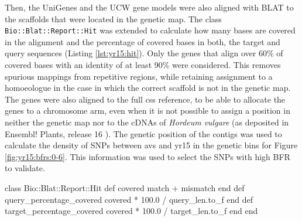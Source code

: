 Then, the UniGenes and the UCW gene models were also aligned with BLAT to the scaffolds that were located in the genetic map.  
The class \texttt{Bio::Blat::Report::Hit}  was extended to calculate how many bases are covered in the alignment and the percentage of covered bases in both, the target and query sequences (Listing \ref{lst:yr15:hit}).
Only the genes that align over 60\% of covered bases with an identity of at least 90\% were considered. 
This removes spurious mappings from repetitive regions, while retaining assignment to a homoeologue in the case in which the correct scaffold is not in the genetic map. 
The genes were also aligned to the full \acrshort{css} reference, to be able to allocate the genes to a chromosome arm, even when it is not possible to assign a position in neither the genetic map nor to the cDNAs of \textit{Hordeum vulgare} \citep{Mayer2011} (as deposited in Ensembl! Plants, release 16 \citep{Kersey2012}). 
The genetic position of the contigs was used to calculate the density of SNPs between \acrshort{avs} and \acrshort{yr15} in the genetic bins for Figure \ref{fig:yr15:bfrs:0-6}. 
This information was used to select the SNPs with high BFR to validate.  

\begin{code}[language=Ruby, caption=Extension to \texttt{Bio::Blat::Report::Hit} for filtering of spurious alignments., label=lst:yr15:hit]
class Bio::Blat::Report::Hit
  def covered
    match + mismatch
  end
  def query_percentage_covered
    covered * 100.0 / query_len.to_f
  end
  def target_percentage_covered
    covered * 100.0 / target_len.to_f
  end
end
\end{code}

